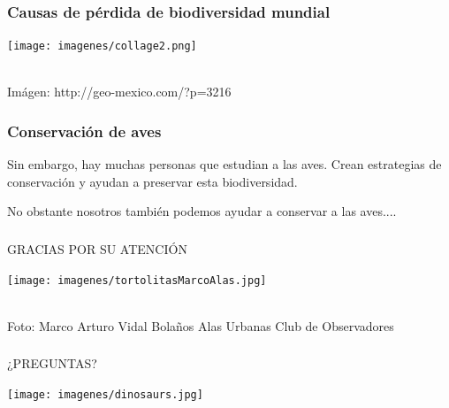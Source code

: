 \documentclass[compress]{beamer}
\begin{document}
{
  \begin{frame}
    \frametitle{Causas de pérdida de biodiversidad mundial}
    
      \begin{center}
	\texttt{[image: imagenes/collage2.png]}\\
	\captionof{}{}
      \end{center}\\[-0.2cm]

   \tiny{Imágen: http://geo-mexico.com/?p=3216 }  
   \end{frame}
}

{
  \begin{frame}
    \frametitle{Conservación de aves}
      Sin embargo, hay muchas personas que estudian a las aves.
      Crean estrategias de conservación y ayudan a preservar esta biodiversidad.
      
      No obstante nosotros también podemos ayudar a 
      conservar a las aves....

   \end{frame}
}


{
  \begin{frame}
    \frametitle{}
      \begin{center}
	  \LARGE GRACIAS POR SU ATENCIÓN
      \end{center}
      \begin{center}
	\texttt{[image: imagenes/tortolitasMarcoAlas.jpg]}\\
	\captionof{}{}
      \end{center}\\[-0.2cm]

   \tiny{Foto: Marco Arturo Vidal Bolaños Alas Urbanas Club de Observadores }  
 
    

   \end{frame}
}

{
  \begin{frame}
    \frametitle{}
      \begin{center}
	  \LARGE ¿PREGUNTAS?
      \end{center}
      \begin{center}
	\texttt{[image: imagenes/dinosaurs.jpg]}\\
	\captionof{}{}
      \end{center}\\[-0.2cm]

 
    

   \end{frame}
}
\end{document}
